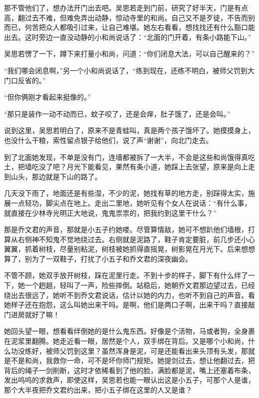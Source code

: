 那不管他们了，想办法开门出去吧。吴思若走到门前，研究了好半天，门是有点高，翻过去不难，但难免弄出动静，惊动寺里的和尚。自己又不是歹徒，不告而别而已，何苦把众人都吸引过来，让自己难堪。她左右看看，想找找还有什么豁口能出去。这时旁边一直没动静的小和尚说话了：“北面的门开着，有条小路能下山。”

吴思若愣了一下，蹲下来打量小和尚，问道：“你们闭息大法，可以自己醒来的？”

“我们哪会闭息啊，”另一个小和尚说话了，“练到现在，还练不明白，被师父罚到大门口反省的。”

“但你俩刚才看起来挺像的。”

“那只是装作一动不动而已，蚊子咬了，还是会痒，肚子饿了，还是会叫。”

说到这里，吴思若明白了，原来不是青蛙叫，真是两个孩子饿坏了。她摸摸身上，也没什么干粮，索性留点银子给他们，说了声“谢谢”，向北门走去。

到了北面她发现，不单是没有门，连墙都被拆了一大半，不会是这些和尚饿得真吃土，把墙吃没了吧？月光下能看见，果然有条小道，她踩上去张望，原来是向上走到山头，那边就是下山的路了。

几天没下雨了，地面还是有些湿，不少的泥，她找有草的地方走，别踩得太实，施展一点轻功，脚尖点在地上。走出二里地，她听见有个女人在说话：“有什么事，就直接在少林寺光明正大地说，鬼鬼祟祟的，把我约到这里干什么？”

那是乔文君的声音，那就是小五子约她喽。尽管算情敌，她可不想趴他们墙根，打算从右侧神不知鬼不觉地绕过去。右侧就是泥路了，鞋子肯定要脏，前几步还小心翼翼，抓着树枝，尽量别粘泥，树枝被她抓得直摇晃，树影晃在月光下。后来想想算了，别为了一双鞋子，打扰了小五子和乔文君的深夜幽会。

不管不顾，她双手放开树枝，踩在泥里行走。不到十步的样子，脚下有什么绊了一下，她一个趔趄，轻叫了一声，险些摔倒。站稳后，她朝乔文君那边望过去，已经绕出去很远了，她听不到乔文君说话，估计以她的内力，也听不到自己的声音。看她样子还在抱怨，这么叫她出来干吗。是啊，他们是两口子啊，出来干吗？直接敲门进房就好了嘛！

她回头望一眼，想看看绊倒她的是什么鬼东西。好像是个活物，马或者狗，全身裹在泥浆里翻腾。她走近看一眼，居然是个人，双手绑在背后。又是哪个小和尚，什么功没练好，被师父罚到这里？虽然浑身是泥，可是还能看出来头顶有头发，那就是不是和尚，我救你一命，可不是坏你师门规矩。她提剑过去，想让他翻过去，把背后的绳子一剑削断，这时才依稀看到了他的脸，满脸都是泥，嘴上还塞着布条，发出呜呜的求救声，即使这样，吴思若也能一眼认出这是小五子，可那个人是谁，那个大半夜把乔文君约出来，把小五子绑在这里的人又是谁？

\newpage
